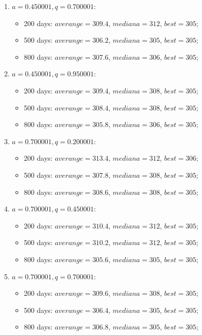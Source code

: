 \begin{enumerate}
\begin{enumerate}
\begin{itemize}
		\end{itemize}
		\item $a= 0.450001, q= 0.700001$:
		\begin{itemize}
			\item 200 days: $averange = 309.4$, $mediana = 312$, $best = 305$;
			\item 500 days: $averange = 306.2$, $mediana = 305$, $best = 305$;
			\item 800 days: $averange = 307.6$, $mediana = 306$, $best = 305$;
		\end{itemize}
		\item $a= 0.450001, q= 0.950001$:
		\begin{itemize}
			\item 200 days: $averange = 309.4$, $mediana = 308$, $best = 305$;
			\item 500 days: $averange = 308.4$, $mediana = 308$, $best = 305$;
			\item 800 days: $averange = 305.8$, $mediana = 306$, $best = 305$;
		\end{itemize}
		\item $a= 0.700001, q= 0.200001$:
		\begin{itemize}
			\item 200 days: $averange = 313.4$, $mediana = 312$, $best = 306$;
			\item 500 days: $averange = 307.8$, $mediana = 308$, $best = 305$;
			\item 800 days: $averange = 308.6$, $mediana = 308$, $best = 305$;
		\end{itemize}
		\item $a= 0.700001, q= 0.450001$:
		\begin{itemize}
			\item 200 days: $averange = 310.4$, $mediana = 312$, $best = 305$;
			\item 500 days: $averange = 310.2$, $mediana = 312$, $best = 305$;
			\item 800 days: $averange = 305.6$, $mediana = 305$, $best = 305$;
		\end{itemize}
		\item $a= 0.700001, q= 0.700001$:
		\begin{itemize}
			\item 200 days: $averange = 309.6$, $mediana = 308$, $best = 305$;
			\item 500 days: $averange = 306.4$, $mediana = 305$, $best = 305$;
			\item 800 days: $averange = 306.8$, $mediana = 305$, $best = 305$;

\end{itemize}
\end{enumerate}
\end{enumerate}
